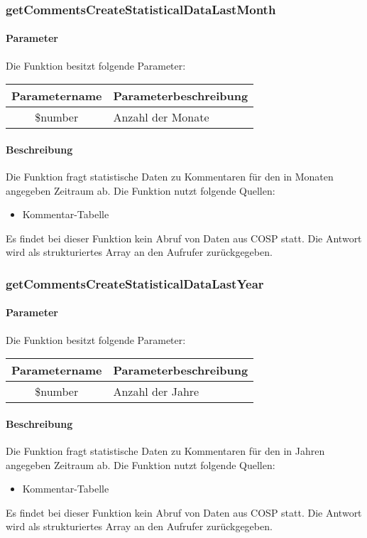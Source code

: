 \subsubsection{getCommentsCreateStatisticalDataLastMonth}
\paragraph{Parameter} Die Funktion besitzt folgende Parameter:
\begin{table}[H]
	\begin{tabular}{|c|p{11cm}|}
		\hline
		\textbf{Parametername} & \textbf{Parameterbeschreibung} \\ \hline
		\$number & Anzahl der Monate \\ \hline
	\end{tabular}
\end{table}
\paragraph{Beschreibung} Die Funktion fragt statistische Daten zu Kommentaren für den in Monaten angegeben Zeitraum ab. Die Funktion nutzt folgende Quellen:
\begin{itemize}
	\item Kommentar-Tabelle
\end{itemize}
Es findet bei dieser Funktion kein Abruf von Daten aus {\glqq COSP\grqq} statt. Die Antwort wird als strukturiertes Array an den Aufrufer zurückgegeben.
\subsubsection{getCommentsCreateStatisticalDataLastYear}
\paragraph{Parameter} Die Funktion besitzt folgende Parameter:
\begin{table}[H]
	\begin{tabular}{|c|p{11cm}|}
		\hline
		\textbf{Parametername} & \textbf{Parameterbeschreibung} \\ \hline
		\$number & Anzahl der Jahre \\ \hline
	\end{tabular}
\end{table}
\paragraph{Beschreibung} Die Funktion fragt statistische Daten zu Kommentaren für den in Jahren angegeben Zeitraum ab. Die Funktion nutzt folgende Quellen:
\begin{itemize}
	\item Kommentar-Tabelle
\end{itemize}
Es findet bei dieser Funktion kein Abruf von Daten aus {\glqq COSP\grqq} statt. Die Antwort wird als strukturiertes Array an den Aufrufer zurückgegeben.
